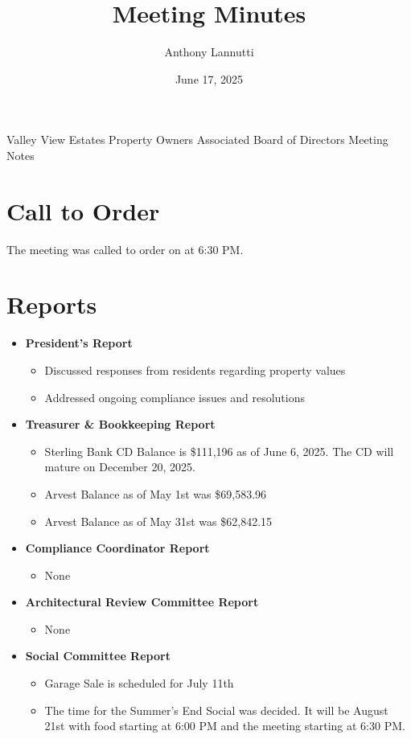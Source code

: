 \documentclass[12pt,a4paper]{article}
\author{Anthony Lannutti}
\date{June 17, 2025}
\title{Meeting Minutes}
\begin{document}
\begin{center}
  Valley View Estates Property Owners Associated Board of Directors Meeting Notes\break{}
  \@date{}
\end{center}

\section*{Call to Order}
\begin{flushleft}
The meeting was called to order on \@date{} at 6:30 PM\@.
\end{flushleft}


\section*{Reports}
\begin{itemize}
  \item \textbf{President's Report}
  \begin{itemize}
    \item Discussed responses from residents regarding property values
    \item Addressed ongoing compliance issues and resolutions
  \end{itemize}
  \item \textbf{Treasurer \& Bookkeeping Report}
  \begin{itemize}
    \item Sterling Bank CD Balance is \$111,196 as of June 6, 2025. The CD will mature on December 20, 2025.
    \item Arvest Balance as of May 1st was \$69,583.96
    \item Arvest Balance as of May 31st was \$62,842.15
  \end{itemize}
  \item \textbf{Compliance Coordinator Report}
  \begin{itemize}
    \item None
  \end{itemize}
  \item \textbf{Architectural Review Committee Report}
  \begin{itemize}
    \item None
  \end{itemize}
  \item \textbf{Social Committee Report}
  \begin{itemize}
    \item Garage Sale is scheduled for July 11th
    \item The time for the Summer's End Social was decided. It will be August 21st with food starting at 6:00 PM and the meeting starting at 6:30 PM.

\end{itemize}
\end{itemize}
\end{document}
